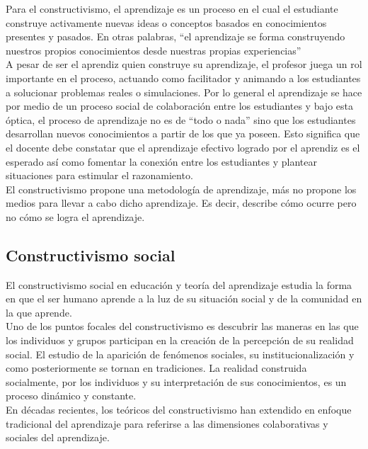 Para el constructivismo, el aprendizaje es un proceso en el cual el estudiante construye activamente nuevas ideas o conceptos basados en conocimientos presentes y pasados. En otras palabras, ``el aprendizaje se forma construyendo nuestros propios conocimientos desde nuestras propias experiencias'' \citep{Constructivismo_Ormrod2003}\\

A pesar de ser el aprendiz quien construye su aprendizaje, el profesor juega un rol importante en el proceso, actuando como facilitador y animando a los estudiantes a solucionar problemas reales o simulaciones. Por lo general el aprendizaje se hace por medio de un proceso social de colaboración entre los estudiantes y bajo esta óptica, el proceso de aprendizaje no es de ``todo o nada'' sino que los estudiantes desarrollan nuevos conocimientos a partir de los que ya poseen. Esto significa que el docente debe constatar que el aprendizaje efectivo logrado por el aprendiz es el esperado así como fomentar la conexión entre los estudiantes y plantear situaciones para estimular el razonamiento.\\

El constructivismo propone una metodología de aprendizaje, más no propone los medios para llevar a cabo dicho aprendizaje. Es decir, describe cómo ocurre pero no cómo se logra el aprendizaje.

\subsection{Constructivismo social}
El constructivismo social en educación y teoría del aprendizaje estudia la forma en que el ser humano aprende a la luz de su situación social y de la comunidad en la que aprende.\\

Uno de los puntos focales del constructivismo es descubrir las maneras en las que los individuos y grupos participan en la creación de la percepción de su realidad social. El estudio de la aparición de fenómenos sociales, su institucionalización y como posteriormente se tornan en tradiciones. La realidad construida socialmente, por los individuos y su interpretación de sus conocimientos, es un proceso dinámico y constante. \\

En décadas recientes, los teóricos del constructivismo han extendido en enfoque tradicional del aprendizaje para referirse a las dimensiones colaborativas y sociales del aprendizaje.  \\

